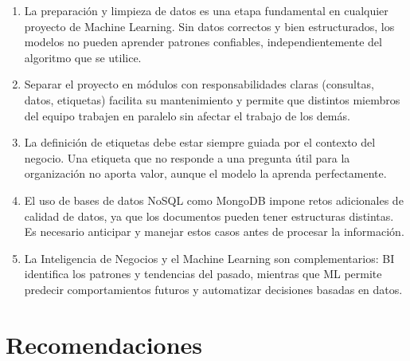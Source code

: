 \documentclass[12pt,a4paper]{article}
\begin{document}
\begin{enumerate}[leftmargin=*, label=\textbf{\arabic*.}]

  \item La preparaci\'on y limpieza de datos es una etapa fundamental
        en cualquier proyecto de Machine Learning. Sin datos correctos
        y bien estructurados, los modelos no pueden aprender patrones
        confiables, independientemente del algoritmo que se utilice.

  \item Separar el proyecto en m\'odulos con responsabilidades claras
        (consultas, datos, etiquetas) facilita su mantenimiento y permite
        que distintos miembros del equipo trabajen en paralelo sin
        afectar el trabajo de los dem\'as.

  \item La definici\'on de etiquetas debe estar siempre guiada por el
        contexto del negocio. Una etiqueta que no responde a una pregunta
        \'util para la organizaci\'on no aporta valor, aunque el modelo
        la aprenda perfectamente.

  \item El uso de bases de datos NoSQL como MongoDB impone retos
        adicionales de calidad de datos, ya que los documentos pueden
        tener estructuras distintas. Es necesario anticipar y manejar
        estos casos antes de procesar la informaci\'on.

  \item La Inteligencia de Negocios y el Machine Learning son
        complementarios: BI identifica los patrones y tendencias del
        pasado, mientras que ML permite predecir comportamientos futuros
        y automatizar decisiones basadas en datos.

\end{enumerate}

\section{Recomendaciones}
\end{document}
